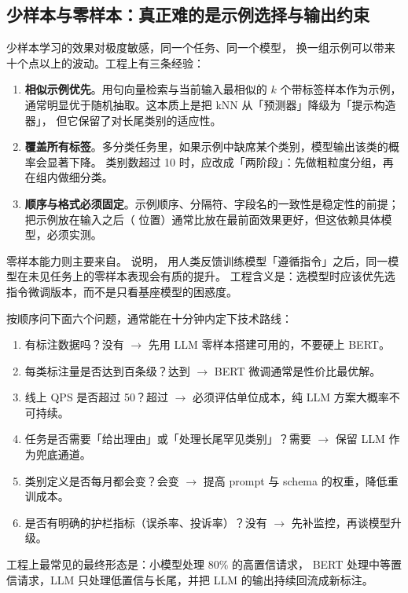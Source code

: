 \subsection{少样本与零样本：真正难的是示例选择与输出约束}

少样本学习的效果对极度敏感，同一个任务、同一个模型，
换一组示例可以带来十个点以上的波动。工程上有三条经验：

\begin{enumerate}
  \item \textbf{相似示例优先}。用句向量检索与当前输入最相似的 $k$ 个带标签样本作为示例，
        通常明显优于随机抽取。这本质上是把 kNN 从「预测器」降级为「提示构造器」，
        但它保留了对长尾类别的适应性。
  \item \textbf{覆盖所有标签}。多分类任务里，如果示例中缺席某个类别，模型输出该类的概率会显著下降。
        类别数超过 10 时，应改成「两阶段」：先做粗粒度分组，再在组内做细分类。
  \item \textbf{顺序与格式必须固定}。示例顺序、分隔符、字段名的一致性是稳定性的前提；
        把示例放在输入之后（ 位置）通常比放在最前面效果更好，但这依赖具体模型，必须实测。
\end{enumerate}

零样本能力则主要来自。\cite{ouyang2022instructgpt} 说明，
用人类反馈训练模型「遵循指令」之后，同一模型在未见任务上的零样本表现会有质的提升。
工程含义是：选模型时应该优先选指令微调版本，而不是只看基座模型的困惑度。

\begin{toolbox}[三方案选型决策清单]
按顺序问下面六个问题，通常能在十分钟内定下技术路线：
\begin{enumerate}
  \item 有标注数据吗？没有 $\to$ 先用 LLM 零样本搭建可用的，不要硬上 BERT。
  \item 每类标注量是否达到百条级？达到 $\to$ BERT 微调通常是性价比最优解。
  \item 线上 QPS 是否超过 50？超过 $\to$ 必须评估单位成本，纯 LLM 方案大概率不可持续。
  \item 任务是否需要「给出理由」或「处理长尾罕见类别」？需要 $\to$ 保留 LLM 作为兜底通道。
  \item 类别定义是否每月都会变？会变 $\to$ 提高 prompt 与 schema 的权重，降低重训成本。
  \item 是否有明确的护栏指标（误杀率、投诉率）？没有 $\to$ 先补监控，再谈模型升级。
\end{enumerate}
工程上最常见的最终形态是：小模型处理 80\% 的高置信请求，
BERT 处理中等置信请求，LLM 只处理低置信与长尾，并把 LLM 的输出持续回流成新标注。
\end{toolbox}

